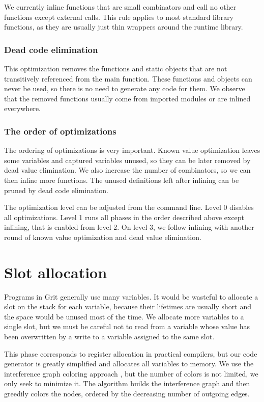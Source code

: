 We currently inline functions that are small combinators and call no other
functions except external calls. This rule applies to most standard library
functions, as they are usually just thin wrappers around the runtime library.

\subsubsection{Dead code elimination}

This optimization removes the functions and static objects that are not
transitively referenced from the main function. These functions and objects can
never be used, so there is no need to generate any code for them. We observe
that the removed functions usually come from imported modules or are inlined
everywhere.

\subsubsection{The order of optimizations}

The ordering of optimizations is very important. Known value optimization leaves
some variables and captured variables unused, so they can be later removed by
dead value elimination. We also increase the number of combinators, so we can
then inline more functions. The unused definitions left after inlining can be
pruned by dead code elimination.

The optimization level can be adjusted from the command line. Level 0 disables
all optimizations. Level 1 runs all phases in the order described above except
inlining, that is enabled from level 2. On level 3, we follow inlining with
another round of known value optimization and dead value elimination.

\section{Slot allocation}

Programs in Grit generally use many variables. It would be wasteful to allocate
a slot on the stack for each variable, because their lifetimes are usually short
and the space would be unused most of the time. We allocate more variables to a
single slot, but we must be careful not to read from a variable whose value has
been overwritten by a write to a variable assigned to the same slot.

This phase corresponds to register allocation in practical compilers, but our
code generator is greatly simplified and allocates all variables to memory. We
use the interference graph coloring approach
\cite{chaitin1981register,chaitin1982register,briggs1994improvements}, but the
number of colors is not limited, we only seek to minimize it. The algorithm
builds the interference graph and then greedily colors the nodes, ordered by the
decreasing number of outgoing edges.

